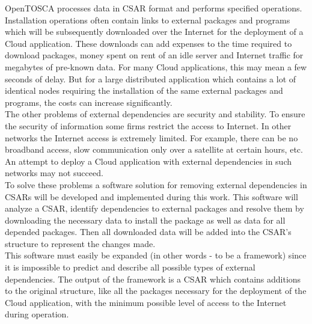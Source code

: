 OpenTOSCA processes data in CSAR format and performs specified operations. %
Installation operations often contain links to external packages and programs which will be subsequently downloaded over the Internet for the deployment of a Cloud application.
These downloads can add expenses to the time required to download packages, money spent on rent of an idle server and Internet traffic for megabytes of pre-known data.
For many Cloud applications, this may mean a few seconds of delay. 
But for a large distributed application which contains a lot of identical nodes requiring the installation of the same external packages and programs, the costs can increase significantly.\\
The other problems of external dependencies are security and stability.
To ensure the security of information some firms restrict the access to Internet.
In other networks the Internet access is extremely limited.
For example, there can be no broadband access, slow communication only over a satellite at certain hours, etc.
An attempt to deploy a Cloud application with external dependencies in such networks may not succeed. \\
To solve these problems a software solution for removing external dependencies in CSARs will be developed and implemented during this work.
This software will analyze a CSAR, identify dependencies to external packages and resolve them by downloading the necessary data to install the package as well as data for all depended packages. 
Then all downloaded data will be added into the CSAR's structure to represent the changes made.
\\
This software must easily be expanded (in other words - to be a framework) since it is impossible to predict and describe all possible types of external dependencies.
The output of the framework is a CSAR which contains additions to the original structure, like all the packages necessary for the deployment of the Cloud application, with the minimum possible level of access to the Internet during operation.
